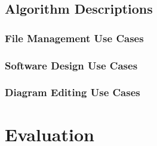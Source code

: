 \documentclass[a4paper]{article}
\begin{document}
	\subsection{Algorithm Descriptions}
		\subsubsection{File Management Use Cases}
		\subsubsection{Software Design Use Cases}
		\subsubsection{Diagram Editing Use Cases}
	 
\section{Evaluation}
\end{document}
